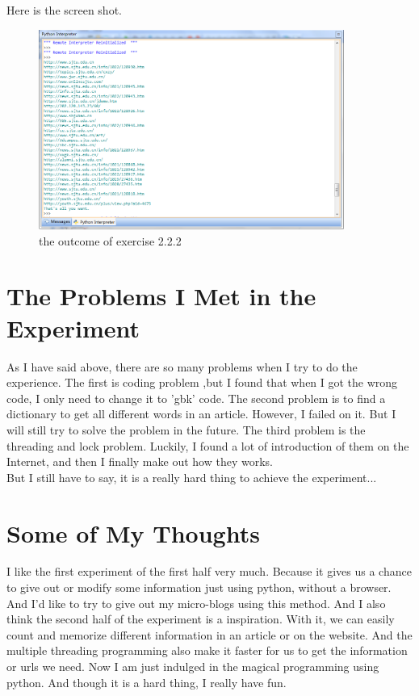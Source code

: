 \documentclass{article}
\begin{document}
Here is the screen shot.\\
\begin{figure}[htbp]
\centering
\includegraphics[width=10cm]{5.png}
\caption{the outcome of exercise 2.2.2}
\end{figure}
\section{The Problems I Met in the Experiment}
As I have said above, there are so many problems when I try to do the experience. The first is coding problem ,but I found that when I got the wrong code, I only need to change it to 'gbk' code. The second problem is to find a dictionary to get all different words in an article. However, I failed on it. But I will still try to solve the problem in the future. The third problem is the threading and lock problem. Luckily, I found a lot of introduction of them on the Internet, and then I finally make out how they works. \\
But I still have to say, it is a really hard thing to achieve the experiment...\\
\section{Some of My Thoughts}
I like the first experiment of the first half very much. Because it gives us a chance to give out or modify some information just using python, without a browser. And I'd like to try to give out my micro-blogs using this method. And I also think the second half of the experiment is a inspiration. With it, we can easily count and memorize different information in an article or on the website. And the multiple threading programming also make it faster for us to get the information or urls we need. Now I am just indulged in the magical programming using python. And though it is a hard thing, I really have fun.
\end{document}
